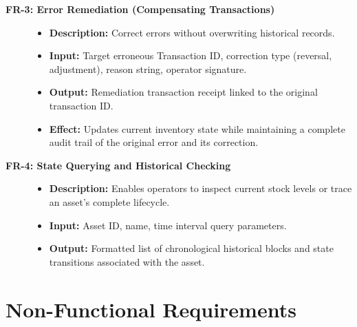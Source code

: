 \documentclass[11pt, a4paper, oneside]{memoir}
\begin{document}
\begin{description}
    \item[\textbf{FR-3: Error Remediation (Compensating Transactions)}]\hfill
    \begin{itemize}
        \item \textbf{Description:} Correct errors without overwriting historical records.
        \item \textbf{Input:} Target erroneous Transaction ID, correction type (reversal, adjustment), reason string, operator signature.
        \item \textbf{Output:} Remediation transaction receipt linked to the original transaction ID.
        \item \textbf{Effect:} Updates current inventory state while maintaining a complete audit trail of the original error and its correction.
    \end{itemize}

    \item[\textbf{FR-4: State Querying and Historical Checking}]\hfill
    \begin{itemize}
        \item \textbf{Description:} Enables operators to inspect current stock levels or trace an asset's complete lifecycle.
        \item \textbf{Input:} Asset ID, name, time interval query parameters.
        \item \textbf{Output:} Formatted list of chronological historical blocks and state transitions associated with the asset.
    \end{itemize}
\end{description}

\section{Non-Functional Requirements}
\end{document}
